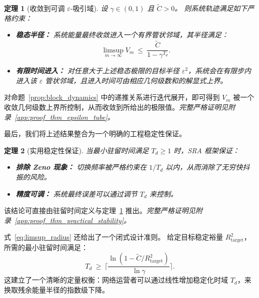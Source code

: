 \documentclass[journal]{IEEEtran}
\theoremstyle{plain}
\newtheorem{theorem}{定理}
\theoremstyle{definition}
\begin{document}
\begin{theorem}[收敛到可调 $\varepsilon$-吸引域]
\label{thm:epsilon_tube}
设 $\gamma \in (0,1)$ 且 $\tilde C > 0$。
则系统轨迹满足如下严格约束：
\begin{itemize}
    \item[\textit{(a)}] \textbf{稳态半径：} 系统能量最终收敛进入一个有界管状邻域，其半径满足：
    \begin{equation}\label{eq:limsup_radius}
    \limsup_{m\to\infty}V_m\ \le\ \frac{\tilde C}{1-\gamma^{T_d}}.
    \end{equation}
    \item[\textit{(b)}] \textbf{有限时间进入：} 对任意大于上述稳态极限的目标半径 $\varepsilon^2$，系统会在有限步内进入该 $\varepsilon$ 管状邻域，且进入时间可由相应几何级数和的解显式上界。
\end{itemize}
\end{theorem}
\begin{IEEEproof}[证明思路]
对命题~\ref{prop:block_dynamics} 中的递推关系进行迭代展开，即可得到 $V_m$ 被一个收敛几何级数上界所控制，从而收敛到所给出的极限值。\textit{完整严格证明见附录~\ref{app:proof_thm_epsilon_tube}。}
\end{IEEEproof}

最后，我们将上述结果整合为一个明确的工程稳定性保证。

\begin{theorem}[实用稳定性保证]
\label{thm:practical_stability}
当最小驻留时间满足 $T_d \ge 1$ 时，SRA 框架保证：
\begin{itemize}
    \item[\textit{(a)}] \textbf{排除 Zeno 现象：} 切换频率被严格约束在 $1/T_d$ 以内，从而消除了无穷快抖振的风险。
    \item[\textit{(b)}] \textbf{精度可调：} 系统最终误差可以通过调节 $T_d$ 来控制。
\end{itemize}
\end{theorem}
\begin{IEEEproof}[证明思路]
该结论可直接由驻留时间定义与定理~\ref{thm:epsilon_tube} 推出。\textit{完整严格证明见附录~\ref{app:proof_thm_practical_stability}。}
\end{IEEEproof}

式~\eqref{eq:limsup_radius} 还给出了一个闭式设计准则。
给定目标稳定裕量 $R_{\text{target}}^2$，所需的最小驻留时间满足：
\begin{equation}\label{eq:design_parameter_Td}
T_d\ \ge\ \Big\lceil \frac{\ln(1-\tilde C/R_{\text{target}}^2)}{\ln \gamma}\Big\rceil.
\end{equation}
这建立了一个清晰的定量权衡：网络运营者可以通过线性增加稳定化时域 $T_d$，来换取残余能量半径的指数级下降。
\end{document}
